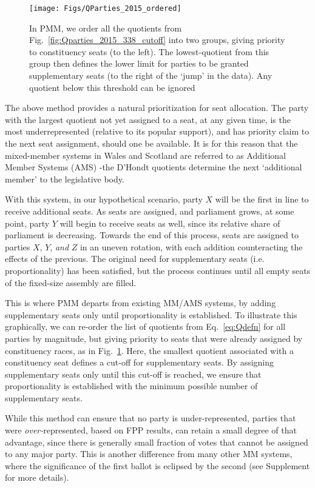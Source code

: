 \documentclass[DIV=calc, paper=a4, fontsize=11pt, twocolumn]{scrartcl}	 %
\begin{document}
\begin{figure}[h!]
  \texttt{[image: Figs/QParties\_2015\_ordered]}
  \captionsetup{format=default}
  \caption{ In PMM, we order all the quotients from Fig.~\ref{fig:Qparties_2015_338_cutoff} into two groups, giving priority to constituency seats (to the left). The lowest-quotient from this group then defines the lower limit for parties to be granted supplementary seats (to the right of the `jump' in the data). Any quotient below this threshold can be ignored }
\label{fig:QParties_2015_ordered}
\end{figure}


The above method provides a natural prioritization for seat allocation. 
The party with the largest quotient not yet assigned to a seat, at any given time, is the most underrepresented (relative to its popular support), and has priority claim to the next seat assignment, should one be available. 
It is for this reason that the mixed-member systems in Wales and Scotland are referred to as Additional Member Systems (AMS) \--the D'Hondt quotients determine the next `additional member' to the legislative body. 

With this system, in our hypothetical scenario, party $X$ will be the first in line to receive additional seats. As seats are assigned, and parliament grows, at some point, party $Y$ will begin to receive seats as well, since its relative share of parliament is decreasing. 
Towards the end of this process, seats are assigned to parties $X$, $Y$, \emph{and} $Z$ in an uneven rotation, with each addition counteracting the effects of the previous. The original need for supplementary seats (i.e. proportionality) has been satisfied, but the process continues until all empty seats of the fixed-size assembly are filled. 

This is where PMM departs from existing MM/AMS systems, by adding supplementary seats only until proportionality is established. To illustrate this graphically, we can re-order the list of quotients from Eq.~\ref{eq:Qdefn} for all parties by magnitude, but giving priority to seats that were already assigned by constituency races, as in Fig.~\ref{fig:QParties_2015_ordered}. 
Here, the smallest quotient associated with a constituency seat defines a cut-off for supplementary seats. By assigning supplementary seats only until this cut-off is reached, we ensure that proportionality is established with the minimum possible number of supplementary seats. 

While this method can ensure that no party is under-represented, parties that were \emph{over-}represented, based on FPP results, can retain a small degree of that advantage, since there is generally small fraction of votes that cannot be assigned to any major party. This is another difference from many other MM systems, where the significance of the first ballot is eclipsed by the second (see Supplement for more details). 
\end{document}
